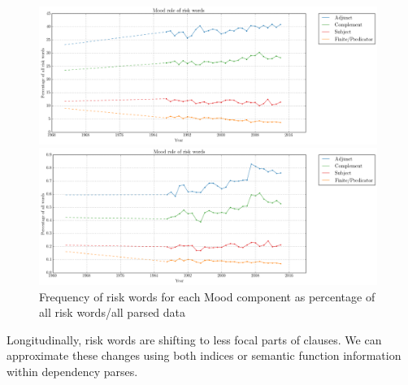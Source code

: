 \noindent
\begin{figure}[htb!]
\centering
\begin{minipage}{.48\textwidth}
\centering
\includegraphics[width=0.98\textwidth]{../images/mood_role_of_risk_words_old.png}
\end{minipage}%
\begin{minipage}{.48\textwidth}
\centering
\includegraphics[width=0.98\textwidth]{../images/riskdep_allwords.png}
\end{minipage}
\caption[Frequency of risk words for each Mood component]{Frequency of risk words for each Mood component as percentage of all risk words\slash all parsed data}
\label{fig:interpersonalarg}
\end{figure}



\vspace{5mm}\noindent\begin{tcolorbox}[colback=yellow!5,colframe=yellow!40!black,title=Summary: risk and arguability]
\parbox{1\textwidth}{%
Longitudinally, risk words are shifting to less focal parts of clauses. We can approximate these changes using both indices or semantic function information within dependency parses.}
\end{tcolorbox}
\vspace{5mm}

